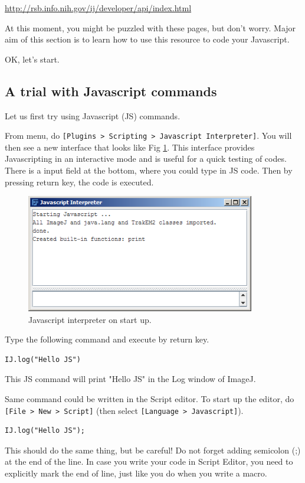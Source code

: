 \documentclass[11pt,a4paper,oneside]{report}
\newcommand{\ijmenu}[1]{\texttt{\small#1}}
\begin{document}
\url{http://rsb.info.nih.gov/ij/developer/api/index.html}

At this moment, you might be puzzled with these pages, 
but don't worry. Major aim of this section is to learn how to use this resource 
to code your Javascript. 

OK, let's start. 

\subsection{A trial with Javascript commands}
%
Let us first try using Javascript (JS) commands. 

From menu, do \ijmenu{[Plugins > Scripting > Javascript Interpreter]}. 
You will then see a new interface that looks like Fig \ref{fig:JSinterpreter}. 
This interface provides Javascripting in an interactive mode and is useful for 
a quick testing of codes. There is a input field at the bottom, where you could type in JS code. 
Then by pressing return key, the code is executed.  

\begin{figure}[htbp]
\begin{center}
\includegraphics[width=100mm]{fig2/JSinterpreterStasrtUp.png}
\caption{Javascript interpreter on start up.}
\label{fig:JSinterpreter}
\end{center}
\end{figure} 

Type the following command and execute by return key. 
\begin{lstlisting}[numbers=none]
IJ.log("Hello JS")
\end{lstlisting}
This JS command will print "Hello JS" in the Log window of ImageJ.  

Same command could be written in the Script editor. To start up the editor, 
do \ijmenu{[File > New > Script]} (then select \ijmenu{[Language > Javascript]}). 
\begin{lstlisting}[numbers=none]
IJ.log("Hello JS");
\end{lstlisting}
This should do the same thing, but be careful! Do not forget adding semicolon
(;) at the end of the line. In case you write your code in Script Editor, you need
to explicitly mark the end of line, just like you do when you write a macro.
\end{document}
